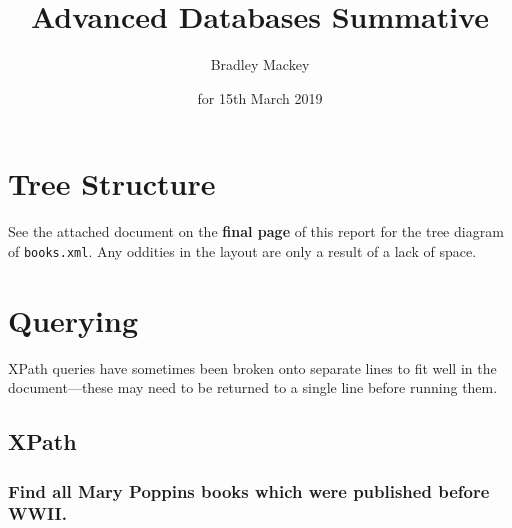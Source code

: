 \documentclass[11pt]{article}
\begin{document}
\title{\textbf{Advanced Databases Summative}}
\date{for 15th March 2019}
\author{Bradley Mackey}
\maketitle

\section{Tree Structure}

See the attached document on the \textbf{final page} of this report for the tree diagram of \texttt{books.xml}. Any oddities in the layout are only a result of a lack of space.

\section{Querying}

XPath queries have sometimes been broken onto separate lines to fit well in the document---these may need to be returned to a single line before running them.

\subsection{XPath}

\subsubsection{Find all Mary Poppins books which were published before WWII.}
\end{document}
